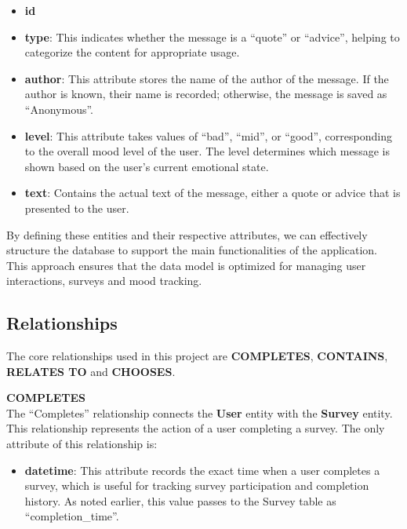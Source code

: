 \begin{itemize}
    \item \textbf{id}
    \item \textbf{type}: This indicates whether the message is a ``quote'' or ``advice'', helping to categorize the content for appropriate usage.
    \item \textbf{author}: This attribute stores the name of the author of the message. If the author is known, their name is recorded; otherwise, the message is saved as ``Anonymous''.
    \item \textbf{level}: This attribute takes values of ``bad'', ``mid'', or ``good'', corresponding to the overall mood level of the user. The level determines which message is shown based on the user’s current emotional state.
    \item \textbf{text}: Contains the actual text of the message, either a quote or advice that is presented to the user.
\end{itemize}

\vspace{10mm}

\noindent By defining these entities and their respective attributes, we can effectively structure the database to support the main functionalities of the application. This approach ensures that the data model is optimized for managing user interactions, surveys and mood tracking.

\subsection{Relationships}
The core relationships used in this project are \textbf{COMPLETES}, \textbf{CONTAINS}, \textbf{RELATES TO} and \textbf{CHOOSES}.

\vspace{5mm}

\noindent \textbf{COMPLETES} \\
The ``Completes'' relationship connects the \textbf{User} entity with the \textbf{Survey} entity. This relationship represents the action of a user completing a survey. The only attribute of this relationship is:

\begin{itemize}
    \item \textbf{datetime}: This attribute records the exact time when a user completes a survey, which is useful for tracking survey participation and completion history. As noted earlier, this value passes to the Survey table as ``completion\_time''.
\end{itemize}

